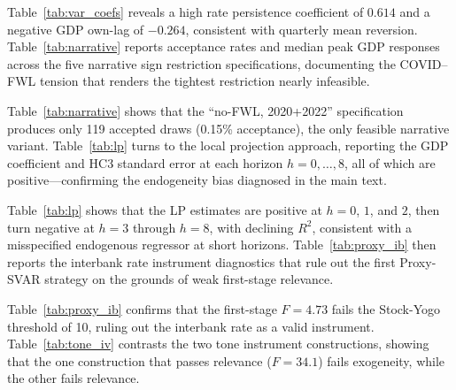 \documentclass[12pt,letterpaper]{article}
\newenvironment{mytable}[2]{%
  \begin{table}[H]
  \centering
  \caption{#1}
  \label{#2}
  \begin{threeparttable}
}{%
  \end{threeparttable}
  \end{table}
}
\begin{document}
Table~\ref{tab:var_coefs} reveals a high rate persistence coefficient of $0.614$
and a negative GDP own-lag of $-0.264$, consistent with quarterly mean reversion.
Table~\ref{tab:narrative} reports acceptance rates and median peak GDP responses
across the five narrative sign restriction specifications, documenting the
COVID--FWL tension that renders the tightest restriction nearly infeasible.

\begin{mytable}{Narrative Sign Restrictions: Results by Specification}{tab:narrative}
  
\end{mytable}

Table~\ref{tab:narrative} shows that the ``no-FWL, 2020+2022'' specification
produces only 119 accepted draws (0.15\% acceptance), the only feasible
narrative variant. Table~\ref{tab:lp} turns to the local projection
approach, reporting the GDP coefficient and HC3 standard error at each
horizon $h=0,\ldots,8$, all of which are positive---confirming the
endogeneity bias diagnosed in the main text.

\begin{mytable}{Local Projections: Rate $\to$ GDP at $h=0,\ldots,8$}{tab:lp}
  
\end{mytable}

Table~\ref{tab:lp} shows that the LP estimates are positive at $h=0$, $1$, and $2$, then turn negative at $h=3$ through $h=8$, with declining $R^2$, consistent with a misspecified endogenous regressor at short horizons.
Table~\ref{tab:proxy_ib} then reports the interbank rate instrument
diagnostics that rule out the first Proxy-SVAR strategy on the grounds of
weak first-stage relevance.

\begin{mytable}{Proxy-SVAR Feasibility: Interbank Rate Instrument}{tab:proxy_ib}
  
\end{mytable}

Table~\ref{tab:proxy_ib} confirms that the first-stage $F=4.73$ fails the
Stock-Yogo threshold of 10, ruling out the interbank rate as a valid instrument.
Table~\ref{tab:tone_iv} contrasts the two tone instrument constructions, showing
that the one construction that passes relevance ($F=34.1$) fails exogeneity,
while the other fails relevance.

\begin{mytable}{Tone Surprise Instrument Validity}{tab:tone_iv}
  
\end{mytable}
\end{document}
